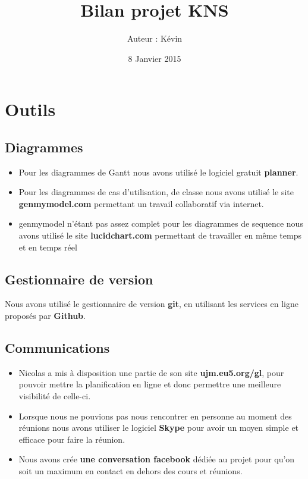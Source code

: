 \documentclass[12pt,a4paper]{article}
\title{Bilan projet KNS}
\author{Auteur : Kévin \bsc{BASCOL}}
\date{8 Janvier 2015}
\begin{document}
\maketitle

\newpage

\section*{Outils}

\subsection*{Diagrammes}
\begin{itemize}
\item Pour les diagrammes de Gantt nous avons utilisé le logiciel gratuit \textbf{planner}.
\item Pour les diagrammes de cas d'utilisation, de classe nous avons utilisé le site \textbf{genmymodel.com} permettant un travail collaboratif via internet.
\item genmymodel n'étant pas assez complet pour les diagrammes de sequence nous avons utilisé le site \textbf{lucidchart.com} permettant de travailler en même temps et en temps réel 
\end{itemize}

\subsection*{Gestionnaire de version}
Nous avons utilisé le gestionnaire de version \textbf{git}, en utilisant les services en ligne proposés par \textbf{Github}.

\subsection*{Communications}
\begin{itemize}
\item Nicolas a mis à disposition une partie de son site \textbf{ujm.eu5.org/gl}, pour pouvoir mettre la planification en ligne et donc permettre une meilleure visibilité de celle-ci.
\item Lorsque nous ne pouvions pas nous rencontrer en personne au moment des réunions nous avons utiliser le logiciel \textbf{Skype} pour avoir un moyen simple et efficace pour faire la réunion.
\item Nous avons crée \textbf{une conversation facebook} dédiée au projet pour qu'on soit un maximum en contact en dehors des cours et réunions.
\end{itemize}
\end{document}
